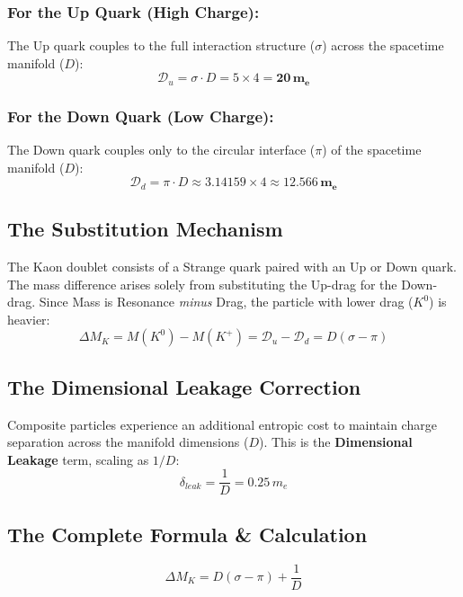 \subsubsection{For the Up Quark (High Charge):} The Up quark couples to the full interaction structure ($\sigma$) across the spacetime manifold ($D$):
\begin{equation}
    \mathcal{D}_u = \sigma \cdot D = 5 \times 4 = \mathbf{20 \, m_e}
\end{equation}

\subsubsection{For the Down Quark (Low Charge):} The Down quark couples only to the circular interface ($\pi$) of the spacetime manifold ($D$):
\begin{equation}
    \mathcal{D}_d = \pi \cdot D \approx 3.14159 \times 4 \approx \mathbf{12.566 \, m_e}
\end{equation}

\subsection*{The Substitution Mechanism}
The Kaon doublet consists of a Strange quark paired with an Up or Down quark. The mass difference arises solely from substituting the Up-drag for the Down-drag. Since Mass is Resonance \textit{minus} Drag, the particle with lower drag ($K^0$) is heavier:
\begin{equation}
    \Delta M_K = M(K^0) - M(K^+) = \mathcal{D}_u - \mathcal{D}_d = D(\sigma - \pi)
\end{equation}

\subsection*{The Dimensional Leakage Correction}
Composite particles experience an additional entropic cost to maintain charge separation across the manifold dimensions ($D$). This is the \textbf{Dimensional Leakage} term, scaling as $1/D$:
\begin{equation}
    \delta_{leak} = \frac{1}{D} = 0.25 \, m_e
\end{equation}

\subsection*{The Complete Formula \& Calculation}
\begin{equation}
    \Delta M_K = D(\sigma - \pi) + \frac{1}{D}
\end{equation}

